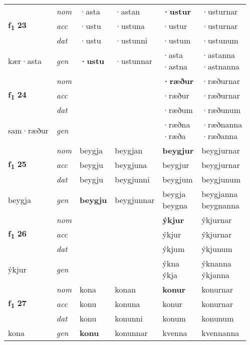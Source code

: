 \begin{longtable}[l]{X>{\footnotesize\itshape}XXXXX}
\multirow{3}{*}{{{\textbf{f{\textsubscript{1}}} \Large{\textbf{23}}}}} & nom & ·asta & ·astan & \textbf{·ustur} & ·usturnar \\*
 & acc & ·ustu & ·ustuna & ·ustur & ·usturnar \\*
 & dat & ·ustu & ·ustunni & ·ustum & ·ustunum \\*
 {\footnotesize{kær\allowbreak ·asta}} & gen & \textbf{·ustu} & ·ustunnar & \specialcell{·asta\\  ·astna} & \specialcell{·astanna\\  ·astnanna} \\
\cmidrule{1-6}

\multirow{3}{*}{{{\textbf{f{\textsubscript{1}}} \Large{\textbf{24}}}}} & nom &  &  & \textbf{·ræður} & ·ræðurnar \\*
 & acc &  &  & ·ræður & ·ræðurnar \\*
 & dat &  &  & ·ræðum & ·ræðunum \\*
 {\footnotesize{sam\allowbreak ·ræður}} & gen & \textbf{} &  & \specialcell{·ræðna\\  ·ræða} & \specialcell{·ræðnanna\\  ·ræðanna} \\
\cmidrule{1-6}

\multirow{3}{*}{{{\textbf{f{\textsubscript{1}}} \Large{\textbf{25}}}}} & nom & beygja & beygjan & \textbf{beygjur} & beygjurnar \\*
 & acc & beygju & beygjuna & beygjur & beygjurnar \\*
 & dat & beygju & beygjunni & beygjum & beygjunum \\*
 {\footnotesize{beygja}} & gen & \textbf{beygju} & beygjunnar & \specialcell{beygja\\ beygna} & \specialcell{beygjanna\\ beygnanna} \\
\cmidrule{1-6}

\multirow{3}{*}{{{\textbf{f{\textsubscript{1}}} \Large{\textbf{26}}}}} & nom &  &  & \textbf{ýkjur} & ýkjurnar \\*
 & acc &  &  & ýkjur & ýkjurnar \\*
 & dat &  &  & ýkjum & ýkjunum \\*
 {\footnotesize{ýkjur}} & gen & \textbf{} &  & \specialcell{ýkna\\ ýkja} & \specialcell{ýknanna\\ ýkjanna} \\
\cmidrule{1-6}

\multirow{3}{*}{{{\textbf{f{\textsubscript{1}}} \Large{\textbf{27}}}}} & nom & kona & konan & \textbf{konur} & konurnar \\*
 & acc & konu & konuna & konur & konurnar \\*
 & dat & konu & konunni & konum & konunum \\*
 {\footnotesize{kona}} & gen & \textbf{konu} & konunnar & kvenna & kvennanna \\
\cmidrule{1-6}


\end{longtable}
